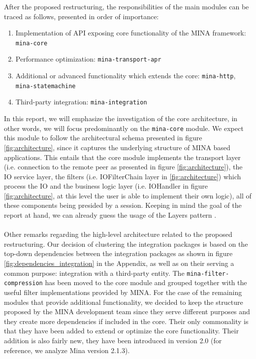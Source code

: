 After the proposed restructuring, the responsibilities of the main modules can be traced as follows, presented in order of importance:
\begin{enumerate}
    \item Implementation of API exposing core functionality of the MINA framework: \texttt{mina-core}
    \item Performance optimization: \texttt{mina-transport-apr}
    \item Additional or advanced functionality which extends the core:  \texttt{mina-http}, \texttt{mina-statemachine}
    \item Third-party integration: \texttt{mina-integration}
\end{enumerate}
In this report, we will emphasize the investigation of the core architecture, in other words, we will focus predominantly on the \texttt{mina-core} module. We expect this module to follow the architectural schema presented in figure \ref{fig:architecture}, since it captures the underlying structure of MINA based applications. This entails that the core module implements the transport layer (i.e. connection to the remote peer as presented in figure \ref{fig:architecture}), the IO service layer, the filters (i.e. IOFilterChain layer in \ref{fig:architecture})  which process the IO and the business logic layer (i.e. IOHandler in figure  \ref{fig:architecture}, at this level the user is able to implement their own logic), all of these components being presided by a session. Keeping in mind the goal of the report at hand, we can already guess the usage of the Layers pattern \cite{archi_patterns}. \\\\
Other remarks regarding the high-level architecture related to the proposed restructuring. Our decision of clustering the integration packages is based on the top-down dependencies between the integration packages as shown in figure \ref{fig:dependencies_integration} in the Appendix, as well as on their serving a common purpose: integration with a third-party entity. The \texttt{mina-filter-compression} has been moved to the core module and grouped together with the useful filter implementations provided by MINA. For the case of the remaining modules that provide additional functionality, we decided to keep the structure proposed by the MINA development team since they serve different purposes and they create more dependencies if included in the core. Their only commonality is that they have been added to extend or optimize the core functionality. Their addition is also fairly new, they have been introduced in version 2.0 (for reference, we analyze Mina version 2.1.3).

